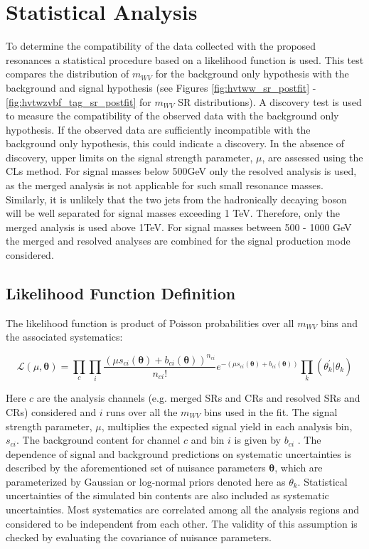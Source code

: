 \chapter{Statistical Analysis}
To determine the compatibility of the data collected with the proposed resonances a statistical procedure based on a likelihood function is used. This test compares the distribution of $m_{WV}$ for the background only hypothesis with the background and signal hypothesis (see Figures \ref{fig:hvtww_sr_postfit} - \ref{fig:hvtwzvbf_tag_sr_postfit} for $m_{WV}$ SR distributions). A discovery test is used to measure the compatibility of the observed data with the background only hypothesis. If the observed data are sufficiently incompatible with the background only hypothesis, this could indicate a discovery. In the absence of discovery, upper limits on the signal strength parameter, $\mu$, are assessed using the CLs method. For signal masses below 500GeV only the resolved analysis is used, as the merged analysis is not applicable for such small resonance masses. Similarly, it is unlikely that the two jets from the hadronically decaying boson will be well separated for signal masses exceeding 1 TeV. Therefore, only the merged analysis is used above 1TeV. For signal masses between 500 - 1000 GeV the merged and resolved analyses are combined for the signal production mode considered.

\section{Likelihood Function Definition}
The likelihood function is product of Poisson probabilities over all $m_{WV}$ bins and the associated systematics:

\begin{equation}
\mathcal{L}(\mu,\bm{\theta})= \prod_{c} \prod_{i} \frac{(\mu s_{ci}(\bm{\theta}) + b_{ci}(\bm{\theta}))^{n_{ci}}}{n_{ci}!} e^{-(\mu s_{ci}(\bm{\theta})+b_{ci}(\bm{\theta}))}\prod_{k}(\theta^{'}_{k}|\theta_{k})
\end{equation}

Here $c$ are the analysis channels (e.g. merged SRs and CRs and resolved SRs and CRs) considered and $i$ runs over all the $m_{WV}$ bins used in the fit. The signal strength parameter, $\mu$, multiplies the expected signal yield in each analysis bin, $s_{ci}$. The background content for channel $c$ and bin $i$ is given by $b_{ci}$ . The dependence of signal and background predictions on systematic uncertainties is described by the aforementioned set of nuisance parameters $\bm{\theta}$, which are parameterized by Gaussian or log-normal priors denoted here as $\theta_{k}$. Statistical uncertainties of the simulated bin contents are also included as systematic uncertainties. Most systematics are correlated among all the analysis regions and considered to be independent from each other. The validity of this assumption is checked by evaluating the covariance of nuisance parameters.  

